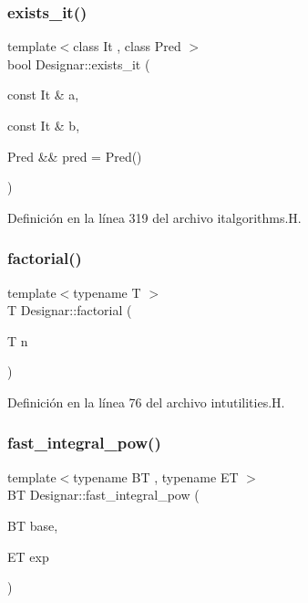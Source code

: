 \subsubsection{\texorpdfstring{exists\+\_\+it()}{exists\_it()}\hspace{0.1cm}{\footnotesize\ttfamily [2/2]}}
{\footnotesize\ttfamily template$<$class It , class Pred $>$ \\
bool Designar\+::exists\+\_\+it (\begin{DoxyParamCaption}\item[{const It \&}]{a,  }\item[{const It \&}]{b,  }\item[{Pred \&\&}]{pred = {\ttfamily Pred()} }\end{DoxyParamCaption})}



Definición en la línea 319 del archivo italgorithms.\+H.

\mbox{\label{namespace_designar_a7760d03bc384dbf96c672da4848b4910}} 
\subsubsection{\texorpdfstring{factorial()}{factorial()}}
{\footnotesize\ttfamily template$<$typename T $>$ \\
T Designar\+::factorial (\begin{DoxyParamCaption}\item[{T}]{n }\end{DoxyParamCaption})}



Definición en la línea 76 del archivo intutilities.\+H.

\mbox{\label{namespace_designar_a28b07c64f84f9fd04d1daa7f6e083aa2}} 
\subsubsection{\texorpdfstring{fast\+\_\+integral\+\_\+pow()}{fast\_integral\_pow()}}
{\footnotesize\ttfamily template$<$typename BT , typename ET $>$ \\
BT Designar\+::fast\+\_\+integral\+\_\+pow (\begin{DoxyParamCaption}\item[{BT}]{base,  }\item[{ET}]{exp }\end{DoxyParamCaption})}



